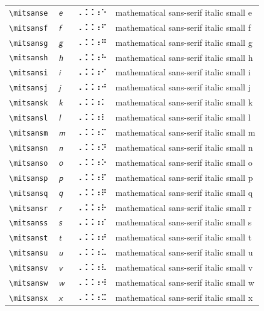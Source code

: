 \documentclass[oneside]{article}
\begin{document}
\begin{longtable}{llll}
\verb|\mitsanse| & $\mitsanse$ &  ⠠⠨⠨⠰⠑  & {mathematical sans-serif italic small e} \\[2ex]
\verb|\mitsansf| & $\mitsansf$ &  ⠠⠨⠨⠰⠋  & {mathematical sans-serif italic small f} \\[2ex]
\verb|\mitsansg| & $\mitsansg$ &  ⠠⠨⠨⠰⠛  & {mathematical sans-serif italic small g} \\[2ex]
\verb|\mitsansh| & $\mitsansh$ &  ⠠⠨⠨⠰⠓  & {mathematical sans-serif italic small h} \\[2ex]
\verb|\mitsansi| & $\mitsansi$ &  ⠠⠨⠨⠰⠊  & {mathematical sans-serif italic small i} \\[2ex]
\verb|\mitsansj| & $\mitsansj$ &  ⠠⠨⠨⠰⠚  & {mathematical sans-serif italic small j} \\[2ex]
\verb|\mitsansk| & $\mitsansk$ &  ⠠⠨⠨⠰⠅  & {mathematical sans-serif italic small k} \\[2ex]
\verb|\mitsansl| & $\mitsansl$ &  ⠠⠨⠨⠰⠇  & {mathematical sans-serif italic small l} \\[2ex]
\verb|\mitsansm| & $\mitsansm$ &  ⠠⠨⠨⠰⠍  & {mathematical sans-serif italic small m} \\[2ex]
\verb|\mitsansn| & $\mitsansn$ &  ⠠⠨⠨⠰⠝  & {mathematical sans-serif italic small n} \\[2ex]
\verb|\mitsanso| & $\mitsanso$ &  ⠠⠨⠨⠰⠕  & {mathematical sans-serif italic small o} \\[2ex]
\verb|\mitsansp| & $\mitsansp$ &  ⠠⠨⠨⠰⠏  & {mathematical sans-serif italic small p} \\[2ex]
\verb|\mitsansq| & $\mitsansq$ &  ⠠⠨⠨⠰⠟  & {mathematical sans-serif italic small q} \\[2ex]
\verb|\mitsansr| & $\mitsansr$ &  ⠠⠨⠨⠰⠗  & {mathematical sans-serif italic small r} \\[2ex]
\verb|\mitsanss| & $\mitsanss$ &  ⠠⠨⠨⠰⠎  & {mathematical sans-serif italic small s} \\[2ex]
\verb|\mitsanst| & $\mitsanst$ &  ⠠⠨⠨⠰⠞  & {mathematical sans-serif italic small t} \\[2ex]
\verb|\mitsansu| & $\mitsansu$ &  ⠠⠨⠨⠰⠥  & {mathematical sans-serif italic small u} \\[2ex]
\verb|\mitsansv| & $\mitsansv$ &  ⠠⠨⠨⠰⠧  & {mathematical sans-serif italic small v} \\[2ex]
\verb|\mitsansw| & $\mitsansw$ &  ⠠⠨⠨⠰⠺  & {mathematical sans-serif italic small w} \\[2ex]
\verb|\mitsansx| & $\mitsansx$ &  ⠠⠨⠨⠰⠭  & {mathematical sans-serif italic small x} \\[2ex]

\end{longtable}
\end{document}
